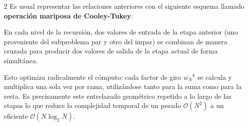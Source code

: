 \documentclass[10pt]{article}
\begin{document}
\begin{multicols}{2}
Es usual representar las relaciones anteriores con el siguiente esquema llamado \textbf{operación mariposa de Cooley-Tukey}:

\begin{center}
\end{center}


En cada nivel de la recursión, dos valores de entrada de la etapa anterior (uno proveniente del subproblema par y otro del impar) se combinan de manera cruzada para producir dos valores de salida de la etapa actual de forma simultánea. 

Esto optimiza radicalmente el cómputo: cada factor de giro $\overline{w_N}^k$ se calcula y multiplica una sola vez por rama, utilizándose tanto para la suma como para la resta. Es precisamente este entrelazado geométrico repetido a lo largo de las etapas lo que reduce la complejidad temporal de un pesado $\mathcal{O}(N^2)$ a un eficiente $\mathcal{O}(N \log_2 N)$.


\end{multicols}
\end{document}
